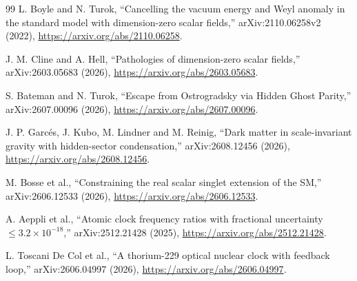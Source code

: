 \documentclass[11pt,a4paper]{article}
\begin{document}
\begin{thebibliography}{99}
L. Boyle and N. Turok,
``Cancelling the vacuum energy and Weyl anomaly in the standard model with dimension-zero scalar fields,''
arXiv:2110.06258v2 (2022),
\url{https://arxiv.org/abs/2110.06258}.

J. M. Cline and A. Hell,
``Pathologies of dimension-zero scalar fields,''
arXiv:2603.05683 (2026),
\url{https://arxiv.org/abs/2603.05683}.

S. Bateman and N. Turok,
``Escape from Ostrogradsky via Hidden Ghost Parity,''
arXiv:2607.00096 (2026),
\url{https://arxiv.org/abs/2607.00096}.

J. P. Garc\'es, J. Kubo, M. Lindner and M. Reinig,
``Dark matter in scale-invariant gravity with hidden-sector condensation,''
arXiv:2608.12456 (2026),
\url{https://arxiv.org/abs/2608.12456}.

M. Bosse et al.,
``Constraining the real scalar singlet extension of the SM,''
arXiv:2606.12533 (2026),
\url{https://arxiv.org/abs/2606.12533}.

A. Aeppli et al.,
``Atomic clock frequency ratios with fractional uncertainty $\le 3.2\times10^{-18}$,''
arXiv:2512.21428 (2025),
\url{https://arxiv.org/abs/2512.21428}.

L. Toscani De Col et al.,
``A thorium-229 optical nuclear clock with feedback loop,''
arXiv:2606.04997 (2026),
\url{https://arxiv.org/abs/2606.04997}.

\end{thebibliography}
\end{document}
